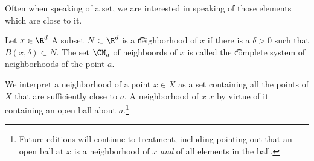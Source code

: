 

Often when speaking of a set, we are interested in speaking of those elements which are close to it.


Let $x \in \R^d$
A subset $N \subset \R^d$ is a \t{neighborhood of $x$} if there is a $\delta > 0$ such that $B(x, \delta) \subset N$.
The set $\CN_a$ of neighboords of $x$ is called the \t{complete system of neighborhoods} of the point $a$.

We interpret a neighborhood of a point $x \in X$ as a set containing all the points of $X$ that are sufficiently close to $a$.
A neighborhood of $x$  $x$ by virtue of it containing an open ball about $a$.\footnote{Future editions will continue to treatment, including pointing out that an open ball at $x$ is a neighborhood of $x$ \textit{and} of all elements in the ball.}


\blankpage
